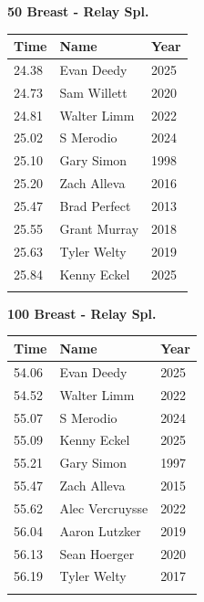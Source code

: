 \vspace{1.2em}
\noindent\begin{minipage}[t]{0.48\textwidth}
\centering
\textbf{\textcolor{teamprimary}{50 Breast - Relay Spl.}}\par
\vspace{0.5em}
\centering
\small
\renewcommand{\arraystretch}{1.0}
\setlength{\tabcolsep}{4pt}
\begin{tabular}{@{}p{1.8cm}p{3.0cm}p{1.0cm}@{}}
\toprule
\textbf{Time} & \textbf{Name} & \textbf{Year} \\
\midrule
24.38 & Evan Deedy & 2025 \\
24.73 & Sam Willett & 2020 \\
24.81 & Walter Limm & 2022 \\
25.02 & S Merodio & 2024 \\
25.10 & Gary Simon & 1998 \\
25.20 & Zach Alleva & 2016 \\
25.47 & Brad Perfect & 2013 \\
25.55 & Grant Murray & 2018 \\
25.63 & Tyler Welty & 2019 \\
25.84 & Kenny Eckel & 2025 \\
\bottomrule
\vspace{0.5em}
\end{tabular}
\end{minipage}
\hfill
\begin{minipage}[t]{0.48\textwidth}
\centering
\textbf{\textcolor{teamprimary}{100 Breast - Relay Spl.}}\par
\vspace{0.5em}
\centering
\small
\renewcommand{\arraystretch}{1.0}
\setlength{\tabcolsep}{4pt}
\begin{tabular}{@{}p{1.8cm}p{3.0cm}p{1.0cm}@{}}
\toprule
\textbf{Time} & \textbf{Name} & \textbf{Year} \\
\midrule
54.06 & Evan Deedy & 2025 \\
54.52 & Walter Limm & 2022 \\
55.07 & S Merodio & 2024 \\
55.09 & Kenny Eckel & 2025 \\
55.21 & Gary Simon & 1997 \\
55.47 & Zach Alleva & 2015 \\
55.62 & Alec Vercruysse & 2022 \\
56.04 & Aaron Lutzker & 2019 \\
56.13 & Sean Hoerger & 2020 \\
56.19 & Tyler Welty & 2017 \\
\bottomrule
\vspace{0.5em}
\end{tabular}
\end{minipage}
